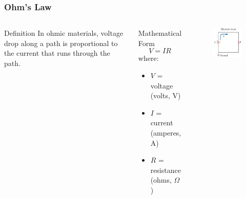 \documentclass{beamer}
\begin{document}
\begin{frame}
    \frametitle{Ohm's Law}
    \begin{columns}
        \begin{block}{Definition}
            In ohmic materials, voltage drop along a path is proportional to the current that runs through the path.
        \end{block}
        
        \begin{block}{Mathematical Form}
            \begin{equation}
                V = IR
            \end{equation}
            where:
            \begin{itemize}
                \item $V$ = voltage (volts, V)
                \item $I$ = current (amperes, A)
                \item $R$ = resistance (ohms, $\Omega$)
            \end{itemize}
        \end{block}
        
        \begin{alertblock}{ }
            \begin{figure}
                \centering
                \includegraphics[width=1\linewidth]{simpcirc.png}
            \end{figure}
        \end{alertblock}
    \end{columns}
\end{frame}
\end{document}

